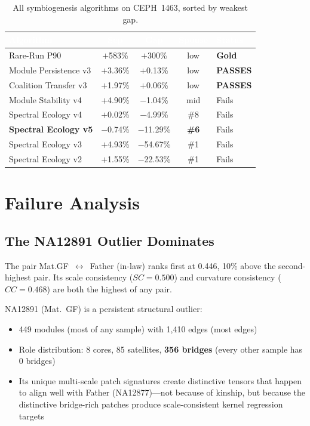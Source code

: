 \documentclass{../yalumba}
\begin{document}
\begin{table}[H]
  \centering
  \tablestyle
  \caption{All symbiogenesis algorithms on CEPH~1463, sorted by weakest gap.}
  \label{tab:all}
  \begin{tabular}{lcccl}
    \toprule
    \rowcolor{table-header}
    \textcolor{white}{\textbf{Algorithm}} &
    \textcolor{white}{\textbf{Sep}} &
    \textcolor{white}{\textbf{Gap}} &
    \textcolor{white}{\textbf{Spouse}} &
    \textcolor{white}{\textbf{Status}} \\
    \midrule
    Rare-Run P90
      & $+$583\% & $+$300\% & low & \textbf{Gold} \\
    Module Persistence v3
      & $+$3.36\% & $+$0.13\% & low & \textbf{PASSES} \\
    Coalition Transfer v3
      & $+$1.97\% & $+$0.06\% & low & \textbf{PASSES} \\
    Module Stability v4
      & $+$4.90\% & $-$1.04\% & mid & Fails \\
    Spectral Ecology v4
      & $+$0.02\% & $-$4.99\% & \#8 & Fails \\
    \textbf{Spectral Ecology v5}
      & $-$0.74\% & $-$11.29\% & \textbf{\#6} & Fails \\
    Spectral Ecology v3
      & $+$4.93\% & $-$54.67\% & \#1 & Fails \\
    Spectral Ecology v2
      & $+$1.55\% & $-$22.53\% & \#1 & Fails \\
    \bottomrule
  \end{tabular}
\end{table}


\section{Failure Analysis}
\label{sec:failure}

\subsection{The NA12891 Outlier Dominates}

The pair Mat.GF~$\leftrightarrow$~Father (in-law) ranks first at 0.446,
10\% above the second-highest pair.  Its scale consistency ($SC = 0.500$)
and curvature consistency ($CC = 0.468$) are both the highest of any pair.

NA12891 (Mat.~GF) is a persistent structural outlier:

\begin{itemize}
  \item 449 modules (most of any sample) with 1{,}410 edges (most edges)
  \item Role distribution: 8 cores, 85 satellites, \textbf{356 bridges}
    (every other sample has 0 bridges)
  \item Its unique multi-scale patch signatures create distinctive tensors
    that happen to align well with Father (NA12877)---not because of
    kinship, but because the distinctive bridge-rich patches produce
    scale-consistent kernel regression targets
\end{itemize}
\end{document}
